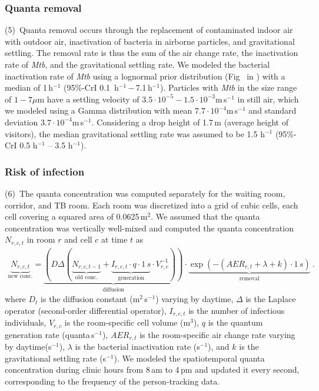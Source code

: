 \documentclass[fleqn,11pt]{wlscirep}
\begin{document}
\subsubsection*{Quanta removal}

(5)~Quanta removal occurs through the replacement of contaminated indoor air with outdoor air, inactivation of bacteria in airborne particles, and gravitational settling. The removal rate is thus the sum of the air change rate, the inactivation rate of \emph{Mtb}, and the gravitational settling rate. We modeled the bacterial inactivation rate of \emph{Mtb} using a lognormal prior distribution (Fig~ in \supp) with a median of 1\,h$^{-1}$ (95\%-CrI 0.1\, h$^{-1}$\,$-$\,7.1\,h$^{-1}$)\cite{Loudon1969AMRRD,Lever2000LettersAppliedMicrobio,Gannon2007ResVetSci,Klein2014IJMyco}. Particles with \emph{Mtb} in the size range of $1-7\mu$m\cite{Fennelly2020Lancet} have a settling velocity of $3.5\cdot 10^{-5}-1.5\cdot 10^{-3}$m\,s$^{-1}$ in still air\cite{Vuorinen2020SafSci}, which we modeled using a Gamma distribution with mean $7.7\cdot 10^{-4}$m\,s$^{-1}$ and standard deviation $3.7\cdot 10^{-4}$m\,s$^{-1}$. Considering a drop height of 1.7\,m (average height of visitors), the median gravitational settling rate was assumed to be 1.5 h$^{-1}$ (95\%-CrI 0.5 h$^{-1}$ – 3.5 h$^{-1}$).

\subsubsection*{Risk of infection}

(6)~The quanta concentration was computed separately for the waiting room, corridor, and TB room. Each room was discretized into a grid of cubic cells, each cell covering a squared area of 0.0625\,m$^2$. We assumed that the quanta concentration was vertically well-mixed and computed the quanta concentration $N_{r,c,t}$ in room $r$ and cell $c$ at time $t$ as
\begin{align}\label{eq:spattemp-N}
     \underbrace{N_{r,c,t}}_{\text{new conc.}} = \underbrace{\left(D \Delta (\underbrace{N_{r,c,t-1}}_{\text{old conc.}} + \underbrace{I_{r,c,t} \cdot q\cdot1\,s}_{\text{generation}}\cdot V_{r,c}^{-1})\right)}_{\text{diffusion}} \cdot \underbrace{\exp\left(-(AER_{r,t} + \lambda + k)\cdot1\,s\right)}_{\text{removal}} ~.
\end{align}
where $D_t$ is the diffusion constant (m$^2$\,s$^{-1}$) varying by daytime, $\Delta$ is the Laplace operator (second-order differential operator), $I_{r,c,t}$ is the number of infectious individuals, $V_{r,c}$ is the room-specific cell volume (m$^3$), $q$ is the quantum generation rate (quanta\,s$^{-1}$), $AER_{r,t}$ is the room-specific air change rate varying by daytime(s$^{-1}$), $\lambda$ is the bacterial inactivation rate (s$^{-1}$), and $k$ is the gravitational settling rate (s$^{-1}$). We modeled the spatiotemporal quanta concentration during clinic hours from 8\,am to 4\,pm and updated it every second, corresponding to the frequency of the person-tracking data.
\end{document}
